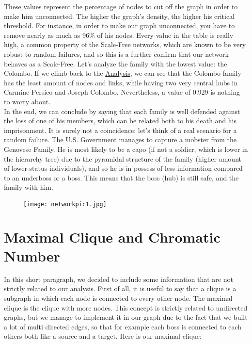 \documentclass{article}
\begin{document}
\noindent
These values represent the percentage of nodes to cut off the graph in order to make him unconnected. The higher the graph's density, the higher his critical threshold. For instance, in order to make our graph unconnected, you have to remove nearly as much as 96\% of his nodes. Every value in the table is really high, a common property of the Scale-Free networks, which are known to be very robust to random failures, and so this is a further confirm that our network behaves as a Scale-Free. Let's analyze the family with the lowest value: the Colombo. If we climb back to the \hyperlink{Analysis}{Analysis}, we can see that the Colombo family has the least amount of nodes and links, while having two very central hubs in Carmine Persico and Joseph Colombo. Nevertheless, a value of 0.929 is nothing to worry about.\\
In the end, we can conclude by saying that each family is well defended against the loss of one of his members, which can be related both to his death and his imprisonment. It is surely not a coincidence: let's think of a real scenario for a random failure. The U.S. Government manages to capture a mobster from the Genovese Family. He is most likely to be a capo (if not a soldier, which is lower in the hierarchy tree) due to the pyramidal structure of the family (higher amount of lower-status individuals), and so he is in possess of less information compared to an underboss or a boss. This means that the boss (hub) is still safe, and the family with him.
\newpage



\pagecolor{white}



\begin{figure}[t!]
\vspace{-250pt}
\centering
\texttt{[image: networkpic1.jpg]}
\advance\leftskip-3.52cm
\end{figure}



\section{\textcolor{Paragrafi}{Maximal Clique and Chromatic Number}}
In this short paragraph, we decided to include some information that are not strictly related to our analysis. First of all, it is useful to say that a clique is a subgraph in which each node is connected to every other node. The maximal clique is the clique with more nodes. This concept is strictly related to undirected graphs, but we manage to implement it in our graph due to the fact that we built a lot of multi directed edges, so that for example each boss is connected to each others both like a source and a target. Here is our maximal clique:
\end{document}
